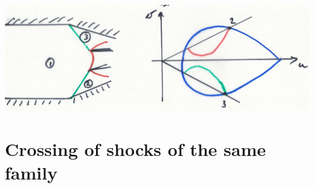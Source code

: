 \begin{center}
\includegraphics[scale=0.1]{ch9/14}
\end{center} 

\section{Crossing of shocks of the same family}

